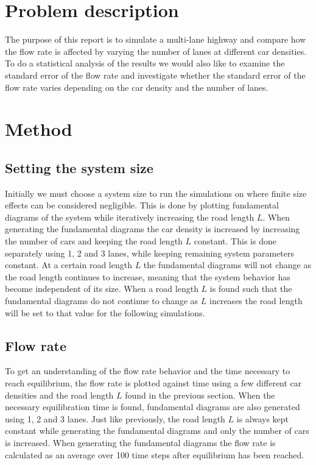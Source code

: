 \documentclass[a4paper,12pt]{article}
\begin{document}

\section*{Problem description}
The purpose of this report is to simulate a multi-lane highway and compare how the flow rate is affected by varying the number
of lanes at different car densities.
To do a statistical analysis of the results we would also like to examine the standard error of the flow rate and investigate whether the 
standard error of the flow rate varies depending on the car density and the number of lanes.

\section*{Method}
\subsection*{Setting the system size}
Initially we must choose a system size to run the simulations on where finite size effects can be considered negligible. This is done by plotting fundamental
diagrams of the system while iteratively increasing the road length $L$. When generating the fundamental diagrams the car density is increased by increasing the number
of cars and keeping the road length $L$ constant. This is done separately using 1, 2 and 3 lanes, while keeping remaining system
parameters constant. At a certain road length $L$ the fundamental diagrams will not change as the road length
continues to increase, meaning that the system behavior has become independent of its size. When a road length $L$ is found such that the fundamental diagrams
do not continue to change as $L$ increases the road length will be set to that value for the following simulations.

\subsection*{Flow rate}
To get an understanding of the flow rate behavior and the time necessary to reach equilibrium, the flow rate is plotted against time using a few different 
car densities and the road length $L$ found in the previous section. When the necessary equilibration time is found, fundamental diagrams are also generated using 1, 2 and 3 lanes. Just like previously,
the road length $L$ is always kept constant while generating the fundamental diagrams and only the number of cars is increased. When generating the fundamental diagrams
the flow rate is calculated as an average over 100 time steps after equilibrium has been reached.
\end{document}
